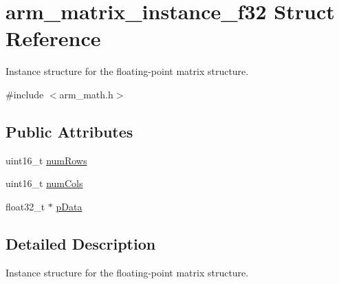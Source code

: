 \hypertarget{structarm__matrix__instance__f32}{\section{arm\-\_\-matrix\-\_\-instance\-\_\-f32 Struct Reference}
\label{structarm__matrix__instance__f32}
}


Instance structure for the floating-\/point matrix structure.  




{\ttfamily \#include $<$arm\-\_\-math.\-h$>$}

\subsection*{Public Attributes}
\begin{DoxyCompactItemize}
\item 
uint16\-\_\-t \hyperlink{structarm__matrix__instance__f32_a23f4e34d70a82c9cad7612add5640b7b}{num\-Rows}
\item 
uint16\-\_\-t \hyperlink{structarm__matrix__instance__f32_acdd1fb73734df68b89565c54f1dd8ae2}{num\-Cols}
\item 
float32\-\_\-t $\ast$ \hyperlink{structarm__matrix__instance__f32_af3917c032600a9dfd5ed4a96f074910a}{p\-Data}
\end{DoxyCompactItemize}


\subsection{Detailed Description}
Instance structure for the floating-\/point matrix structure. 

